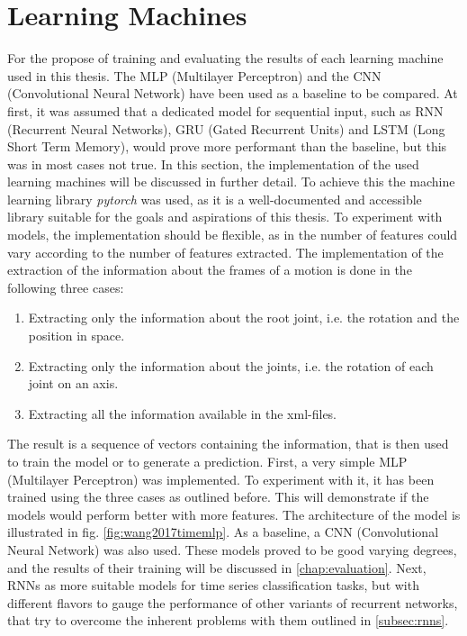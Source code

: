 	\section{Learning Machines}
		\label{section:learningmachines}
		For the propose of training and evaluating the results of each learning machine used in this thesis. The MLP (Multilayer Perceptron) and the CNN (Convolutional Neural Network) have been used as a baseline to be compared. At first, it was assumed that a dedicated model for sequential input, such as RNN (Recurrent Neural Networks), GRU (Gated Recurrent Units) and LSTM (Long Short Term Memory), would prove more performant than the baseline, but this was in most cases not true. In this section, the implementation of the used learning machines will be discussed in further detail. To achieve this the machine learning library \textit{pytorch} was used, as it is a well-documented and accessible library suitable for the goals and aspirations of this thesis. To experiment with models, the implementation should be flexible, as in the number of features could vary according to the number of features extracted. The implementation of the extraction of the information about the frames of a motion is done in the following three cases:
		\begin{enumerate}
			\item Extracting only the information about the root joint, i.e. the rotation and the position in space.
			\item Extracting only the information about the joints, i.e. the rotation of each joint on an axis.
			\item Extracting all the information available in the xml-files.
		\end{enumerate}
		The result is a sequence of vectors containing the information, that is then used to train the model or to generate a prediction.\newline
		First, a very simple MLP (Multilayer Perceptron) was implemented. To experiment with it, it has been trained using the three cases as outlined before. This will demonstrate if the models would perform better with more features. The architecture of the model is illustrated in fig. \ref{fig:wang2017timemlp}. As a baseline, a CNN (Convolutional Neural Network) was also used. These models proved to be good varying degrees, and the results of their training will be discussed in \ref{chap:evaluation}. Next, RNNs as more suitable models for time series classification tasks, but with different flavors to gauge the performance of other variants of recurrent networks, that try to overcome the inherent problems with them outlined in \ref{subsec:rnns}.
